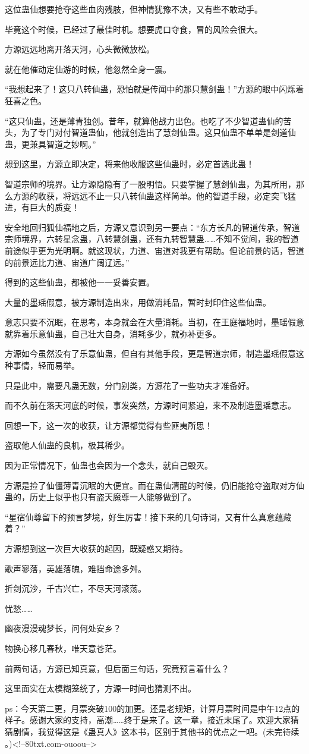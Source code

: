 \begin{this_body}
这位蛊仙想要抢夺这些血肉残肢，但神情犹豫不决，又有些不敢动手。

毕竟这个时候，已经过了最佳时机。想要虎口夺食，冒的风险会很大。

方源远远地离开落天河，心头微微放松。

就在他催动定仙游的时候，他忽然全身一震。

“我想起来了！这只八转仙蛊，恐怕就是传闻中的那只慧剑蛊！”方源的眼中闪烁着狂喜之色。

“这只仙蛊，还是薄青独创。昔年，就算他战力出色。也吃了不少智道蛊仙的苦头，为了专门对付智道蛊仙，他就创造出了慧剑仙蛊。这只仙蛊不单单是剑道仙蛊，更兼具智道之妙啊。”

想到这里，方源立即决定，将来他收服这些仙蛊时，必定首选此蛊！

智道宗师的境界。让方源隐隐有了一股明悟。只要掌握了慧剑仙蛊，为其所用，那么方源的收获，将远远不止一只八转仙蛊这样简单。他的智道手段，必定突飞猛进，有巨大的质变！

安全地回归狐仙福地之后，方源又意识到另一要点：“东方长凡的智道传承，智道宗师境界，六转星念蛊，八转慧剑蛊，还有九转智慧蛊……不知不觉间，我的智道前途似乎更为光明啊。就这现状，力道、宙道对我更有帮助。但论前景的话，智道的前景远比力道、宙道广阔辽远。”

得到的这些仙蛊，都被他一一妥善安置。

大量的墨瑶假意，被方源制造出来，用做消耗品，暂时封印住这些仙蛊。

意志只要不沉眠，在思考，本身就会在大量消耗。当初，在王庭福地时，墨瑶假意就靠着乐意仙蛊，自己壮大自身，消耗多少，就弥补更多。

方源如今虽然没有了乐意仙蛊，但自有其他手段，更是智道宗师，制造墨瑶假意这种事情，轻而易举。

只是此中，需要凡蛊无数，分门别类，方源花了一些功夫才准备好。

而不久前在落天河底的时候，事发突然，方源时间紧迫，来不及制造墨瑶意志。

回想一下，这一次的收获，让方源都觉得有些匪夷所思！

盗取他人仙蛊的良机，极其稀少。

因为正常情况下，仙蛊也会因为一个念头，就自己毁灭。

方源是捡了仙僵薄青沉眠的大便宜。而在蛊仙清醒的时候，仍旧能抢夺盗取对方仙蛊的，历史上似乎也只有盗天魔尊一人能够做到了。

“星宿仙尊留下的预言梦境，好生厉害！接下来的几句诗词，又有什么真意蕴藏着？”

方源想到这一次巨大收获的起因，既疑惑又期待。

歌声寥落，英雄落魄，难挡命途多舛。

折剑沉沙，千古兴亡，不尽天河滚荡。

忧愁……

幽夜漫漫魂梦长，问何处安乡？

物换心移几春秋，唯天意苍茫。

前两句话，方源已知真意，但后面三句话，究竟预言着什么？

这里面实在太模糊笼统了，方源一时间也猜测不出。

ps：今天第二更，月票突破100的加更。还是老规矩，计算月票时间是中午12点的样子。感谢大家的支持，高潮……终于是来了。这一章，接近末尾了。欢迎大家猜猜剧情，我觉得这是《蛊真人》这本书，区别于其他书的优点之一吧。(未完待续 。)<!--80txt.com-ouoou-->

\end{this_body}

